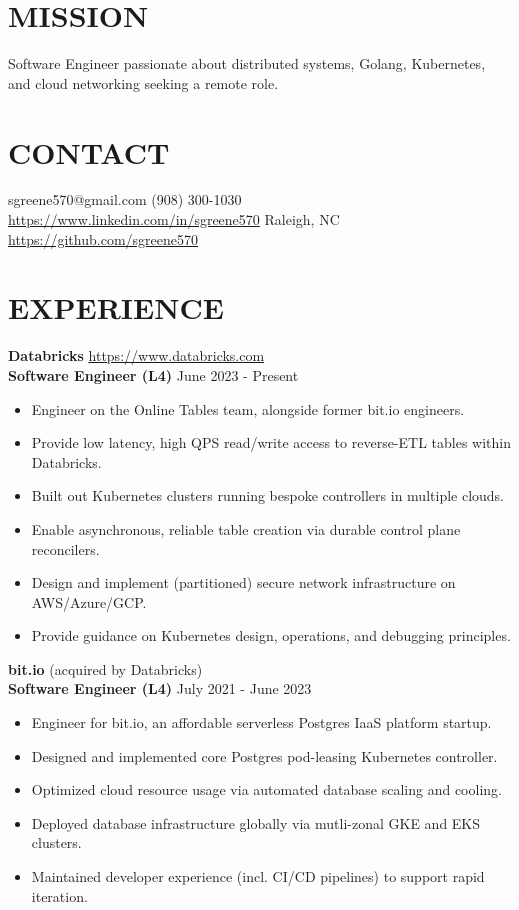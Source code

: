\documentclass[line, margin, 10.5pt]{res}
\begin{document}

\begin{resume}

\section{\small MISSION}
Software Engineer passionate about distributed systems, Golang, Kubernetes, and cloud networking seeking a remote role.

\section{\small CONTACT}
sgreene570@gmail.com \hfill (908) 300-1030 \\
\url{https://www.linkedin.com/in/sgreene570} \hfill Raleigh, NC \\
\url{https://github.com/sgreene570}

\section{\small EXPERIENCE}
{\bf \large{Databricks}} \hfill \url{https://www.databricks.com} \\
{\bf Software Engineer (L4)} \hfill June 2023 - Present
\begin{itemize}
    \item Engineer on the Online Tables team, alongside former bit.io engineers.
    \item Provide low latency, high QPS read/write access to reverse-ETL tables within Databricks.
    \item Built out Kubernetes clusters running bespoke controllers in multiple clouds.
    \item Enable asynchronous, reliable table creation via durable control plane reconcilers.
    \item Design and implement (partitioned) secure network infrastructure on AWS/Azure/GCP.
    \item Provide guidance on Kubernetes design, operations, and debugging principles.
\end{itemize}

{\bf \large{bit.io}} \hfill (acquired by Databricks) \\
{\bf Software Engineer (L4)} \hfill July 2021 - June 2023
\begin{itemize}
    \item Engineer for bit.io, an affordable serverless Postgres IaaS platform startup.
    \item Designed and implemented core Postgres pod-leasing Kubernetes controller.
    \item Optimized cloud resource usage via automated database scaling and cooling.
    \item Deployed database infrastructure globally via mutli-zonal GKE and EKS clusters.
    \item Maintained developer experience (incl. CI/CD pipelines) to support rapid iteration.
\end{itemize}


\end{resume}
\end{document}
